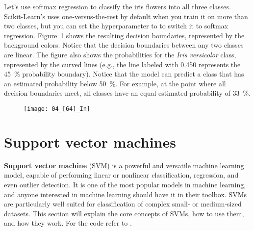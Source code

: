 Let's use softmax regression to classify the iris flowers into all three classes. Scikit-Learn's  uses one-versus-the-rest by default when you train it on more than two classes, but you can set the  hyperparameter to  to switch it to softmax regression. Figure~\ref{04_[64]_In} shows the resulting decision boundaries, represented by the background colors. Notice that the decision boundaries between any two classes are linear. The figure also shows the probabilities for the \emph{Iris versicolor} class, represented by the curved lines (e.g., the line labeled with 0.450 represents the \SI{45}{\percent} probability boundary). Notice that the model can predict a class that has an estimated probability below \SI{50}{\percent}. For example, at the point where all decision boundaries meet, all classes have an equal estimated probability of \SI{33}{\percent}.
\begin{figure}[h!t]
\centering
\texttt{[image: 04\_[64]\_In]}
\caption{}\label{04_[64]_In}
\end{figure}
\section{Support vector machines}
\textbf{Support vector machine} (SVM) is a powerful and versatile machine learning model, capable of performing linear or nonlinear classification, regression, and even outlier detection. It is one of the most popular models in machine learning, and anyone interested in machine learning should have it in their toolbox. SVMs are particularly well suited for classification of complex small- or medium-sized datasets. This section will explain the core concepts of SVMs, how to use them, and how they work. For the code refer to .
